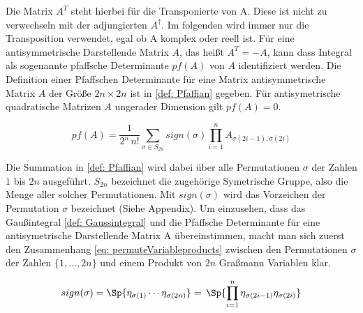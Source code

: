 \noindent Die Matrix $A^T$ steht hierbei für die Transponierte von A. Diese ist nicht zu verwechseln mit der adjungierten $A^\dagger$. Im folgenden wird immer nur die Transposition verwendet, egal ob A komplex oder reell ist. Für eine antisymmetrische Darstellende Matrix $A$, das heißt $A^T = -A$, kann dass Integral als sogenannte pfaffsche Determinante $pf(A)$ von $A$ identifiziert werden. Die Definition einer Pfaffschen Determinante für eine Matrix antisymmetrische Matrix $A$ der Größe $2n \times 2n$ ist in \eqref{def: Pfaffian} gegeben. Für antisymetrische quadratische Matrizen $A$ ungerader Dimension gilt $pf(A) = 0$. 

\begin{equation} \label{def: Pfaffian}
pf(A) = \frac{1}{2^n\,n!} \sum_{\sigma \in S_{2n}} sign(\sigma) \prod_{i=1}^n A_{\sigma(2i-1),\sigma(2i)} 
\end{equation}

\noindent Die Summation in \eqref{def: Pfaffian} wird dabei über alle Permutationen $\sigma$ der Zahlen $1$ bis $2n$ ausgeführt. $S_{2n}$ bezeichnet die zugehörige Symetrische Gruppe, also die Menge aller solcher Permutationen. Mit $sign(\sigma)$ wird das Vorzeichen der Permutation $\sigma$ bezeichnet (Siehe Appendix). 
Um einzusehen, dass das Gaußintegral \eqref{def: Gaussintegral} und die Pfaffsche Determinante für eine antisymetrische Darstellende Matrix A übereinstimmen, macht man sich zuerst den Zusammenhang \eqref{eq: permuteVariableproducts} zwischen den Permutationen $\sigma$ der Zahlen $\{1,\dots,2n\}$ und einem Produkt von $2n$ Graßmann Variablen klar.

\begin{align} \label{eq: permuteVariableproducts}
sign(\sigma) = \Sp{\eta_{\sigma(1)} \cdots \eta_{\sigma(2n)}}  = \,\Sp{ \prod_{i=1}^n \eta_{\sigma(2i-1)}\eta_{\sigma(2i)} }
\end{align}

